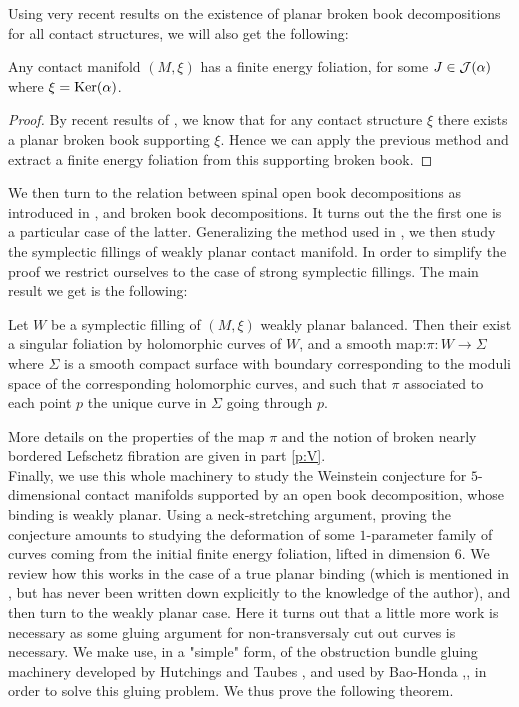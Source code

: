 \documentclass[../main.tex]{subfiles}
\begin{document}
Using very recent results on the existence of planar broken book decompositions for all contact structures, we will also get the following:

\begin{theorem}\label{t:théorème_2}
Any contact manifold $(M,\xi)$ has a finite energy foliation, for some $J\in\mathcal{J}(\alpha)$ where $\xi = \text{Ker}(\alpha)$.
\end{theorem}

\begin{proof}
By recent results of \cite{colin_existence_planar_broken_books}, we know that for any contact structure $\xi$ there exists a planar broken book supporting $\xi$. Hence we can apply the previous method and extract a finite energy foliation from this supporting broken book. 
\end{proof}


We then turn to the relation between spinal open book decompositions as introduced in \cite{SOBD1},\cite{SOBD2} and broken book decompositions. It turns out the the first one is a particular case of the latter. Generalizing the method used in \cite{SOBD2}, we then study the symplectic fillings of weakly planar contact manifold. In order to simplify the proof we restrict ourselves to the case of strong symplectic fillings. The main result we get is the following:

\begin{theorem}\label{t:théorème_3}
Let $W$ be a symplectic filling of $(M,\xi)$ weakly planar balanced. Then their exist a singular foliation by holomorphic curves of $W$, and a smooth map:$\pi :W \rightarrow \Sigma$ where $\Sigma$ is a smooth compact surface with boundary corresponding to the moduli space of the corresponding holomorphic curves, and such that $\pi$ associated to each point $p$ the unique curve in $\Sigma$ going through $p$.
\end{theorem}

More details on the properties of the map $\pi$ and the notion of broken nearly bordered Lefschetz fibration are given in part \ref{p:V}.\\

Finally, we use this whole machinery to study the Weinstein conjecture for $5$-dimensional contact manifolds supported by an open book decomposition, whose binding is weakly planar. Using a neck-stretching argument, proving the conjecture amounts to studying the deformation of some $1$-parameter family of curves coming from the initial finite energy foliation, lifted in dimension $6$. We review how this works in the case of a true planar binding (which is mentioned in \cite{acu_weinstein_2017}, but has never been written down explicitly to the knowledge of the author), and then turn to the weakly planar case. Here it turns out that a little more work is necessary as some gluing argument for non-transversaly cut out curves is necessary. We make use, in a "simple" form, of the obstruction bundle gluing machinery developed by Hutchings and Taubes \cite{hutchings_gluing_2007}, and used by Bao-Honda \cite{bao_definition_2018},\cite{bao_semi-global_2023}, in order to solve this gluing problem. We thus prove the following theorem.
\end{document}

